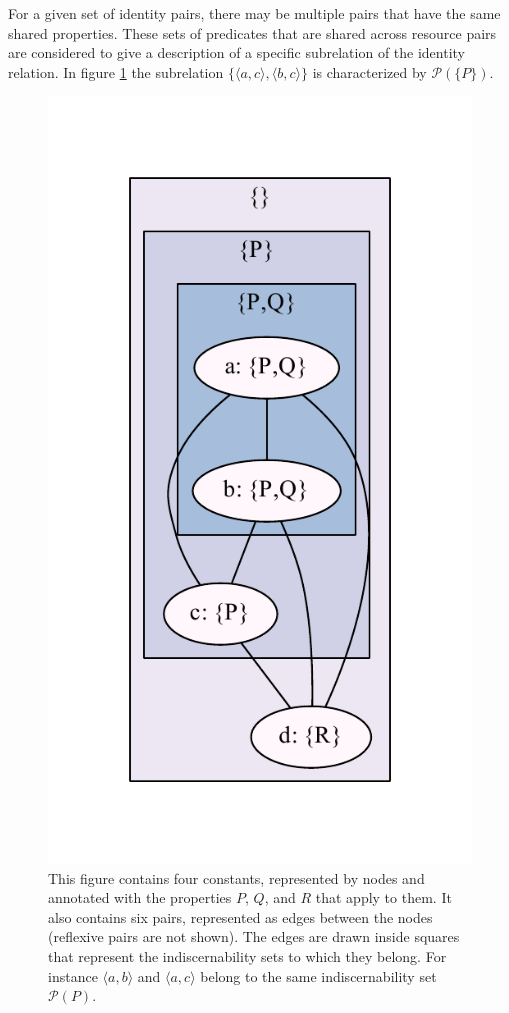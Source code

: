 \documentclass[letterpaper]{article}
\begin{document}
For a given set of identity pairs, there may be multiple pairs that have the same shared properties. These sets of predicates that are shared across resource pairs are considered to give a description of a specific subrelation of the identity relation. In figure \ref{fig:indiscernibility_example} the subrelation $\{ \langle a, c \rangle, \langle b, c \rangle \}$ is characterized by $\mathcal{P}(\{ P \})$.

\begin{figure}
\caption{This figure contains four constants, represented by nodes and annotated with the properties $P$, $Q$, and $R$ that apply to them. It also contains six pairs, represented as edges between the nodes (reflexive pairs are not shown). The edges are drawn inside squares that represent the indiscernability sets to which they belong. For instance $\langle a, b \rangle$ and $\langle a, c \rangle$ belong to the same indiscernability set $\mathcal{P}(P)$.}
\label{fig:indiscernibility_example}
\includegraphics{indiscernibility_example}
\end{figure}
\end{document}
